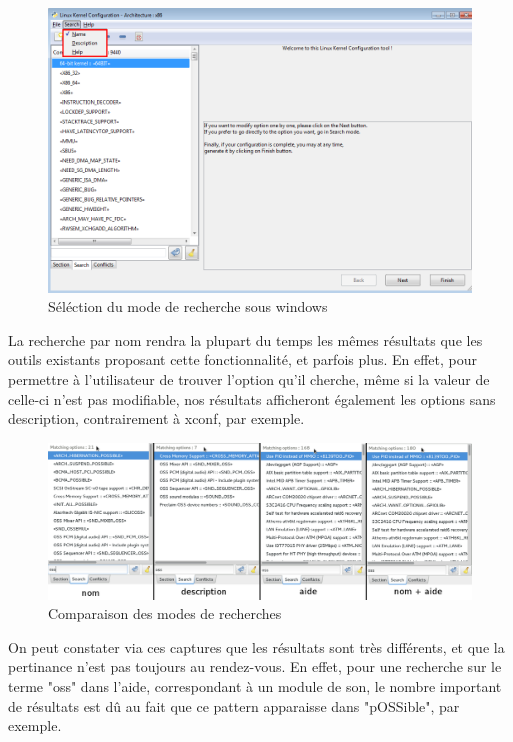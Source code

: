\documentclass[17pts]{report}
\begin{document}
\begin{figure}[H]
    \includegraphics[scale=0.4]{./illustrations/screen_search.png}
    \centering
    \caption{Séléction du mode de recherche sous windows}
    \label{fig:ModesDeRecherche}
\end{figure}

La recherche par nom rendra la plupart du temps les mêmes résultats que les 
outils existants proposant cette fonctionnalité, et parfois plus. En effet, 
pour permettre à l'utilisateur de trouver l'option qu'il cherche, même si 
la valeur de celle-ci n'est pas modifiable, nos résultats afficheront 
également les options sans description, contrairement à xconf, par exemple.\\

\begin{figure}[H]
    \includegraphics[scale=0.4]{./illustrations/search_cmp.png}
    \centering
    \caption{Comparaison des modes de recherches}
    \label{fig:ModesDeRecherche}
\end{figure}

On peut constater via ces captures que les résultats sont très différents, et 
que la pertinance n'est pas toujours au rendez-vous. En effet, pour une 
recherche sur le terme "oss" dans l'aide, correspondant à un module de son, le
 nombre important de résultats est dû au fait que ce pattern apparaisse dans 
"pOSSible", par exemple.\\
\end{document}
